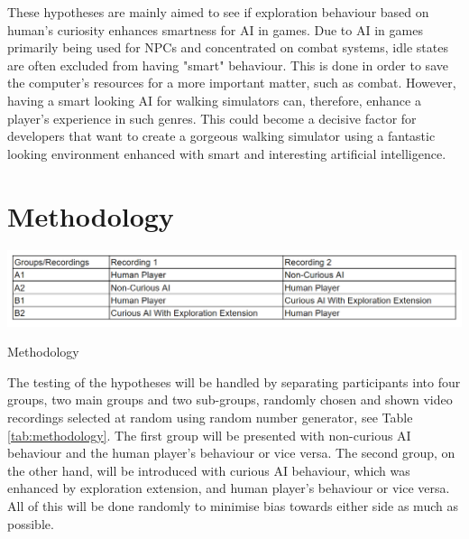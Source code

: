 \documentclass[journal]{IEEEtran}
\begin{document}
These hypotheses are mainly aimed to see if exploration behaviour based on human's curiosity enhances smartness for AI in games. Due to AI in games primarily being used for NPCs and concentrated on combat systems, idle states are often excluded from having "smart" behaviour. This is done in order to save the computer's resources for a more important matter, such as combat. However, having a smart looking AI for walking simulators can, therefore, enhance a player's experience in such genres. This could become a decisive factor for developers that want to create a gorgeous walking simulator using a fantastic looking environment enhanced with smart and interesting artificial intelligence. %

\section{Methodology} %
\begin{table}
	\includegraphics[width=\linewidth]{Images/MethodologyTable.PNG}
	\caption{Methodology}
	\label{tab:methodology}
\end{table}
The testing of the hypotheses will be handled by separating participants into four groups, two main groups and two sub-groups, randomly chosen and shown video recordings selected at random using random number generator, see Table \ref{tab:methodology}. The first group will be presented with non-curious AI behaviour and the human player's behaviour or vice versa. The second group, on the other hand, will be introduced with curious AI behaviour, which was enhanced by exploration extension, and human player's behaviour or vice versa. All of this will be done randomly to minimise bias towards either side as much as possible. %
\end{document}
